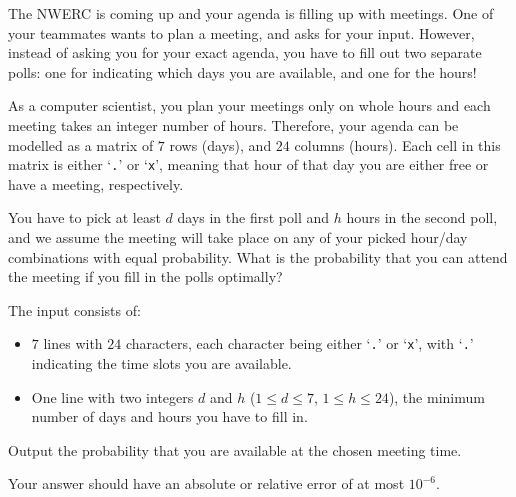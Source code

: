 
\newcommand{\hours}{24}
\newcommand{\days}{7}

The NWERC is coming up and your agenda is filling up with meetings.
One of your teammates wants to plan a meeting, and asks for your input.
However, instead of asking you for your exact agenda, you have to fill out two separate polls:
one for indicating which days you are available, and one for the hours!

As a computer scientist, you plan your meetings only on whole hours and each meeting takes an integer number of hours.
Therefore, your agenda can be modelled as a matrix of $\days$ rows (days), and $\hours$ columns (hours).
Each cell in this matrix is either `\texttt{.}' or `\texttt{x}',
meaning that hour of that day you are either free or have a meeting, respectively.

You have to pick at least $d$ days in the first poll and $h$ hours in the second poll,
and we assume the meeting will take place on any of your picked hour/day combinations with equal probability.
What is the probability that you can attend the meeting if you fill in the polls optimally?

\begin{Input}
    The input consists of:
    \begin{itemize}
        \item $\days$ lines with $\hours$ characters, each character being
            either `\texttt{.}' or `\texttt{x}', with `\texttt{.}' indicating the time
            slots you are available.
        \item One line with two integers $d$ and $h$ ($1 \leq d \leq \days$, $1 \leq h \leq \hours$),
            the minimum number of days and hours you have to fill in.
    \end{itemize}
\end{Input}

\begin{Output}
    Output the probability that you are available at the chosen meeting time.

    Your answer should have an absolute or relative error of at most $10^{-6}$.
\end{Output}
